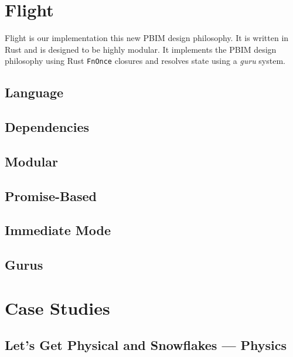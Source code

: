 \documentclass[conference,12pt]{IEEEtran}
\begin{document}
\section{Flight}
Flight is our implementation this new PBIM design philosophy. It is written in
Rust and is designed to be highly modular. It implements the PBIM design
philosophy using Rust \texttt{FnOnce} closures and resolves state using a
\textit{guru} system.

\subsection{Language}

\subsection{Dependencies}

\subsection{Modular}

\subsection{Promise-Based}

\subsection{Immediate Mode}

\subsection{Gurus} %


\section{Case Studies}

\subsection{Let's Get Physical and Snowflakes --- Physics}
\end{document}
